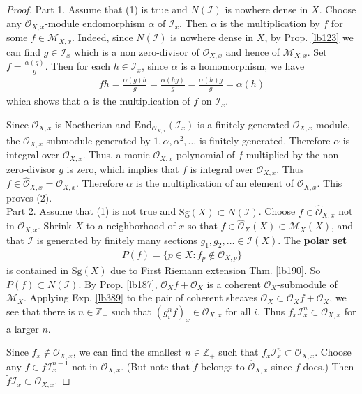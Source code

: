 \documentclass[12pt,b5paper,notitlepage]{report}
\theoremstyle{definition}
\theoremstyle{plain}
\newcommand{\mc}{\mathcal}
\newcommand{\wtd}{\widetilde}
\newcommand{\End}{\mathrm{End}} %
\newcommand{\scr}{\mathscr}
\newcommand{\Zbb}{\mathbb Z}
\newcommand{\Sg}{\mathrm{Sg}}
\newcommand{\Owht}{\widehat{\scr O}}
\numberwithin{equation}{section}
\begin{document}
\begin{proof}
Part 1. Assume that (1) is true and $N(\mc I)$ is nowhere dense in $X$. Choose any $\scr O_{X,x}$-module endomorphism $\alpha$ of $\mc I_x$. Then $\alpha$ is the multiplication by $f$ for some $f\in\scr M_{X,x}$. Indeed, since $N(\mc I)$ is nowhere dense in $X$, by Prop. \ref{lb123} we can find $g\in\mc I_x$ which is a non zero-divisor of $\scr O_{X,x}$ and hence of $\scr M_{X,x}$. Set $f=\frac{\alpha(g)}{g}$. Then for each $h\in\mc I_x$, since $\alpha$ is a homomorphism, we have
\begin{align*}
fh=\frac{\alpha(g)h}{g}=\frac{\alpha(hg)}{g}=\frac{\alpha(h)g}{g}=\alpha(h)
\end{align*}
which shows that $\alpha$ is the multiplication of $f$ on $\mc I_x$.

Since $\scr O_{X,x}$ is Noetherian and $\End_{\scr O_{X,x}}(\mc I_x)$ is a finitely-generated $\scr O_{X,x}$-module, the $\scr O_{X,x}$-submodule generated by $1,\alpha,\alpha^2,\dots$ is finitely-generated. Therefore $\alpha$ is integral over $\scr O_{X,x}$. Thus, a monic $\scr O_{X,x}$-polynomial of $f$ multiplied by the non zero-divisor $g$ is zero, which implies that $f$ is integral over  $\scr O_{X,x}$. Thus $f\in\Owht_{X,x}=\scr O_{X,x}$. Therefore $\alpha$ is the multiplication of an element of $\scr O_{X,x}$. This proves (2).\\


Part 2. Assume that (1) is not true and $\Sg(X)\subset N(\mc I)$. Choose $f\in\Owht_{X,x}$ not in $\scr O_{X,x}$. Shrink $X$ to a neighborhood of $x$ so that $f\in\Owht_X(X)\subset\scr M_X(X)$, and that $\mc I$ is generated by finitely many sections $g_1,g_2,\dots\in\mc I(X)$. The \textbf{polar set}  
\begin{align}
P(f)=\{p\in X:f_p\notin\scr O_{X,p}\}  \label{eq201}
\end{align}
is contained in $\Sg(X)$ due to First Riemann extension Thm. \ref{lb190}. So $P(f)\subset N(\mc I)$. By Prop. \ref{lb187}, $\scr O_Xf+\scr O_X$ is a coherent $\scr O_X$-submodule of $\scr M_X$. Applying Exp. \ref{lb389} to the pair of coherent sheaves $\scr O_X\subset\scr O_Xf+\scr O_X$, we see that there is $n\in\Zbb_+$ such that $(g_i^nf)_x\in\scr O_{X,x}$ for all $i$. Thus $f_x\mc I_x^n\subset\scr O_{X,x}$ for a larger $n$. 

Since $f_x\notin\scr O_{X,x}$, we can find the smallest $n\in\Zbb_+$ such that $f_x\mc I_x^n\subset\scr O_{X,x}$. Choose any $\wtd f\in f\mc I_x^{n-1}$ not in $\scr O_{X,x}$. (But note that $\wtd f$ belongs to $\Owht_{X,x}$ since $f$ does.) Then $\wtd f\mc I_x\subset\scr O_{X,x}$. 


\end{proof}
\end{document}
